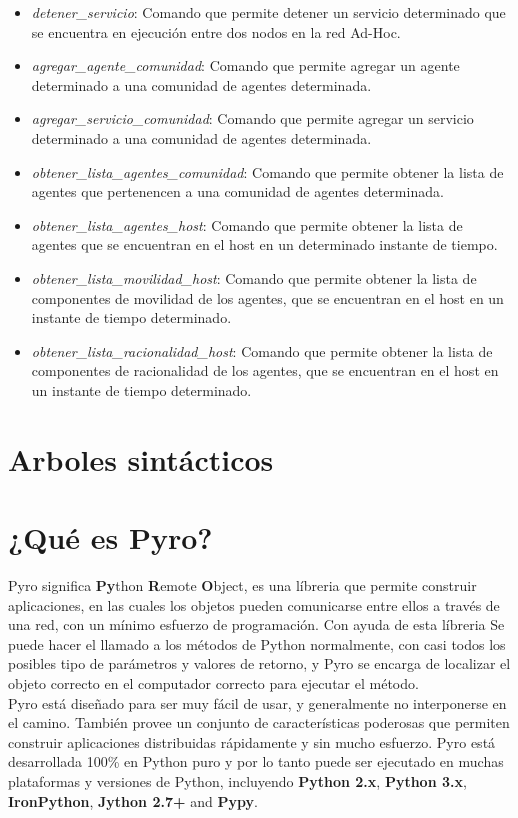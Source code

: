 \documentclass{article}
\begin{document}
\begin{itemize}
\item \textit{detener\_servicio}: Comando que permite detener un servicio determinado que se encuentra en ejecución entre dos nodos en la red Ad-Hoc.
\item \textit{agregar\_agente\_comunidad}: Comando que permite agregar un agente determinado a una comunidad de agentes determinada.
\item \textit{agregar\_servicio\_comunidad}: Comando que permite agregar un servicio determinado a una comunidad de agentes determinada.
\item \textit{obtener\_lista\_agentes\_comunidad}: Comando que permite obtener la lista de agentes que pertenencen a una comunidad de agentes determinada.
\item \textit{obtener\_lista\_agentes\_host}: Comando que permite obtener la lista de agentes que se encuentran en el host en un determinado instante de tiempo.
\item \textit{obtener\_lista\_movilidad\_host}: Comando que permite obtener la lista de componentes de movilidad de los agentes, que se encuentran en el host en un instante de tiempo determinado.
\item \textit{obtener\_lista\_racionalidad\_host}: Comando que permite obtener la lista de componentes de racionalidad de los agentes, que se encuentran en el host en un instante de tiempo determinado.
\end{itemize}

\section{Arboles sintácticos}

\section{¿Qué es Pyro?}
Pyro significa \textbf{Py}thon \textbf{R}emote \textbf{O}bject, es una líbreria que permite construir aplicaciones, en las cuales los objetos pueden comunicarse entre ellos a través de una red, con un mínimo esfuerzo de programación. Con ayuda de esta líbreria Se puede hacer el llamado a los métodos de Python normalmente, con casi todos los posibles tipo de parámetros y valores de retorno, y Pyro se encarga de localizar el objeto correcto en el computador correcto para ejecutar el método.\\

Pyro está diseñado para ser muy fácil de usar, y generalmente no interponerse en el camino. También provee un conjunto de características poderosas que permiten construir aplicaciones distribuidas rápidamente y sin mucho esfuerzo. Pyro está desarrollada 100\% en Python puro y por lo tanto puede ser ejecutado en muchas plataformas y versiones de Python, incluyendo \textbf{Python 2.x}, \textbf{Python 3.x}, \textbf{IronPython}, \textbf{Jython 2.7+} and \textbf{Pypy}.\\
\end{document}
